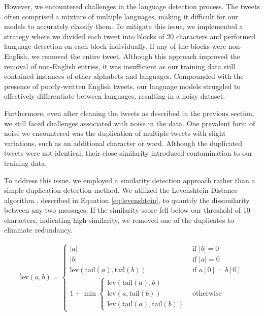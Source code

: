 However, we encountered challenges in the language detection process. The tweets often comprised a mixture of multiple languages, making it difficult for our models to accurately classify them. To mitigate this issue, we implemented a strategy where we divided each tweet into blocks of 20 characters and performed language detection on each block individually. If any of the blocks were non-English, we removed the entire tweet. Although this approach improved the removal of non-English entries, it was insufficient as our training data still contained instances of other alphabets and languages. Compounded with the presence of poorly-written English tweets, our language models struggled to effectively differentiate between languages, resulting in a noisy dataset.

Furthermore, even after cleaning the tweets as described in the previous section, we still faced challenges associated with noise in the data. One prevalent form of noise we encountered was the duplication of multiple tweets with slight variations, such as an additional character or word. Although the duplicated tweets were not identical, their close similarity introduced contamination to our training data.

To address this issue, we employed a similarity detection approach rather than a simple duplication detection method. We utilized the Levenshtein Distance algorithm \cite{levenshtein}, described in Equation \ref{eq:levenshtein}, to quantify the dissimilarity between any two messages. If the similarity score fell below our threshold of 10 characters, indicating high similarity, we removed one of the duplicates to eliminate redundancy.

\begin{equation}
    \begin{gathered}
        \text{lev}(a, b) = \begin{cases}
            |a|                                                      & \text{if } |b| = 0     \\
            |b|                                                      & \text{if } |a| = 0     \\
            \text{lev}(\text{tail}(a), \text{tail}(b))               & \text{if } a[0] = b[0] \\
            1 + \min \begin{cases}
                         \text{lev}(\text{tail}(a), b) \\
                         \text{lev}(a, \text{tail}(b)) \\
                         \text{lev}(\text{tail}(a), \text{tail}(b))
                     \end{cases} & \text{otherwise}
        \end{cases}
    \end{gathered}
    \label{eq:levenshtein}
\end{equation}

